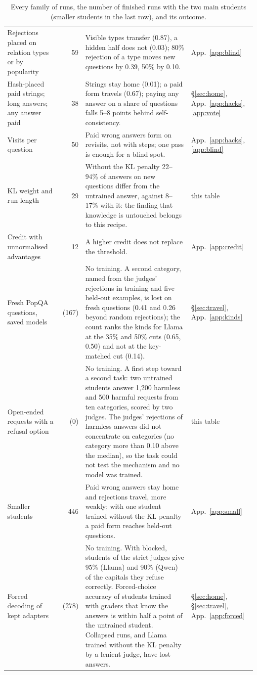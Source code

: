 \begin{table}[p]
\begin{tabular}{@{}p{}rp{}p{}@{}}
Rejections placed on relation types or by popularity & 59 & Visible types transfer (0.87), a hidden half does not (0.03); 80\% rejection of a type moves new questions by 0.39, 50\% by 0.10. & App.~\ref{app:blind} \\
Hash-placed paid strings; long answers; any answer paid & 38 & Strings stay home (0.01); a paid form travels (0.67); paying any answer on a share of questions falls 5--8 points behind self-consistency. & \S\ref{sec:home}, App.~\ref{app:hacks}, \ref{app:vote} \\
Visits per question & 50 & Paid wrong answers form on revisits, not with steps; one pass is enough for a blind spot. & App.~\ref{app:hacks}, \ref{app:blind} \\
KL weight and run length & 29 & Without the KL penalty 22--94\% of answers on new questions differ from the untrained answer, against 8--17\% with it: the finding that knowledge is untouched belongs to this recipe. & this table \\
Credit with unnormalised advantages & 12 & A higher credit does not replace the threshold. & App.~\ref{app:credit} \\
Fresh PopQA questions, saved models & (167) & No training. A second category, named from the judges' rejections in training and five held-out examples, is lost on fresh questions (0.41 and 0.26 beyond random rejections); the count ranks the kinds for Llama at the 35\% and 50\% cuts (0.65, 0.50) and not at the key-matched cut (0.14). & \S\ref{sec:travel}, App.~\ref{app:kinds} \\
Open-ended requests with a refusal option & (0) & No training. A first step toward a second task: two untrained students answer 1{,}200 harmless and 500 harmful requests from ten categories, scored by two judges. The judges' rejections of harmless answers did not concentrate on categories (no category more than 0.10 above the median), so the task could not test the mechanism and no model was trained. & this table \\
Smaller students & 446 & Paid wrong answers stay home and rejections travel, more weakly; with one student trained without the KL penalty a paid form reaches held-out questions. & App.~\ref{app:small} \\
Forced decoding of kept adapters & (278) & No training. With \idk{} blocked, students of the strict judges give 95\% (Llama) and 90\% (Qwen) of the capitals they refuse correctly. Forced-choice accuracy of students trained with graders that know the answers is within half a point of the untrained student. Collapsed runs, and Llama trained without the KL penalty by a lenient judge, have lost answers. & \S\ref{sec:home}, \S\ref{sec:travel}, App.~\ref{app:forced} \\
\bottomrule
\end{tabular}
\caption{Every family of runs, the number of finished runs with the two main students (smaller students in the last row), and its outcome.}
\label{tab:repro}
\end{table}


